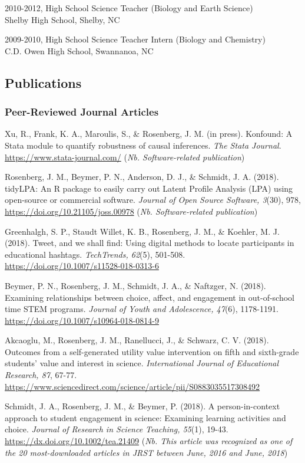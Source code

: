 \documentclass[]{article}
\begin{document}
2010-2012, High School Science Teacher (Biology and Earth Science)\\
Shelby High School, Shelby, NC

2009-2010, High School Science Teacher Intern (Biology and Chemistry)\\
C.D. Owen High School, Swannanoa, NC

\subsection{Publications}\label{publications}

\subsubsection{Peer-Reviewed Journal
Articles}\label{peer-reviewed-journal-articles}

Xu, R., Frank, K. A., Maroulis, S., \& Rosenberg, J. M. (in press).
Konfound: A Stata module to quantify robustness of causal inferences.
\emph{The Stata Journal}. \url{https://www.stata-journal.com/}
(\emph{Nb. Software-related publication})

Rosenberg, J. M., Beymer, P. N., Anderson, D. J., \& Schmidt, J. A.
(2018). tidyLPA: An R package to easily carry out Latent Profile
Analysis (LPA) using open-source or commercial software. \emph{Journal
of Open Source Software, 3}(30), 978,
\url{https://doi.org/10.21105/joss.00978} (\emph{Nb. Software-related
publication})

Greenhalgh, S. P., Staudt Willet, K. B., Rosenberg, J. M., \& Koehler,
M. J. (2018). Tweet, and we shall find: Using digital methods to locate
participants in educational hashtags. \emph{TechTrends, 62}(5), 501-508.
\url{https://doi.org/10.1007/s11528-018-0313-6}

Beymer, P. N., Rosenberg, J. M., Schmidt, J. A., \& Naftzger, N. (2018).
Examining relationships between choice, affect, and engagement in
out-of-school time STEM programs. \emph{Journal of Youth and
Adolescence, 47}(6), 1178-1191.
\url{https://doi.org/10.1007/s10964-018-0814-9}

Akcaoglu, M., Rosenberg, J. M., Ranellucci, J., \& Schwarz, C. V.
(2018). Outcomes from a self-generated utility value intervention on
fifth and sixth-grade students' value and interest in science.
\emph{International Journal of Educational Research, 87}, 67-77.
\url{https://www.sciencedirect.com/science/article/pii/S0883035517308492}

Schmidt, J. A., Rosenberg, J. M., \& Beymer, P. (2018). A
person-in-context approach to student engagement in science: Examining
learning activities and choice. \emph{Journal of Research in Science
Teaching, 55}(1), 19-43. \url{https://dx.doi.org/10.1002/tea.21409}
(\emph{Nb. This article was recognized as one of the 20 most-downloaded
articles in JRST between June, 2016 and June, 2018})
\end{document}

